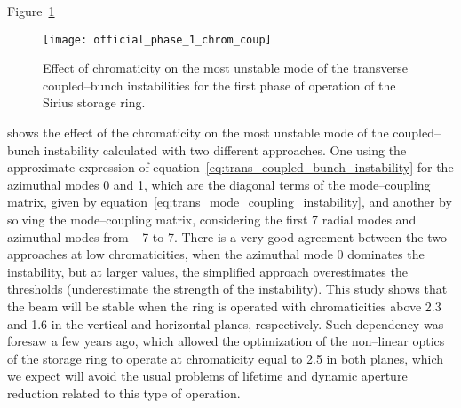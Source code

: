     Figure~\ref{fig:ph1_chrom_coup}
    \begin{figure}
        \centering
        \texttt{[image: official\_phase\_1\_chrom\_coup]}
        \caption{Effect of chromaticity on the most unstable mode of the transverse coupled--bunch instabilities for the first phase of operation of the Sirius storage ring.}
        \label{fig:ph1_chrom_coup}
    \end{figure}
    shows the effect of the chromaticity on the most unstable mode of the coupled--bunch instability calculated with two different approaches. One using the approximate expression of equation~\ref{eq:trans_coupled_bunch_instability} for the azimuthal modes \num{0} and \num{1}, which are the diagonal terms of the mode--coupling matrix, given by equation~\ref{eq:trans_mode_coupling_instability}, and another by solving the mode--coupling matrix, considering the first \num{7} radial modes and azimuthal modes from \num{-7} to \num{7}.
    There is a very good agreement between the two approaches at low chromaticities, when the azimuthal mode \num{0} dominates the instability, but at larger values, the simplified approach overestimates the thresholds (underestimate the strength of the instability).
    This study shows that the beam will be stable when the ring is operated with chromaticities above \num{2.3} and \num{1.6} in the vertical and horizontal planes, respectively. Such dependency was foresaw a few years ago, which allowed the optimization of the non--linear optics of the storage ring to operate at chromaticity equal to \num{2.5} in both planes, which we expect will avoid the usual problems of lifetime and dynamic aperture reduction related to this type of operation.

